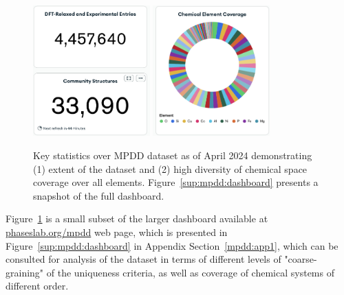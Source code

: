 \begin{figure}[H]
    \centering
    \includegraphics[width=0.4\textwidth]{mpdd/Screenshot 2024-05-05 at 11.54.32.png}
    \includegraphics[width=0.4\textwidth]{mpdd/Screenshot 2024-05-05 at 11.54.47.png}
    \caption{Key statistics over MPDD dataset as of April 2024 demonstrating (1) extent of the dataset and (2) high diversity of chemical space coverage over all elements. Figure~\ref{sup:mpdd:dashboard} presents a snapshot of the full dashboard.}
    \label{mpdd:fig:dataset}
\end{figure}

Figure~\ref{mpdd:fig:dataset} is a small subset of the larger dashboard available at \href{https://phaseslab.org/mpdd}{phaseslab.org/mpdd} web page, which is presented in Figure~\ref{sup:mpdd:dashboard} in Appendix Section~\ref{mpdd:app1}, which can be consulted for analysis of the dataset in terms of different levels of "coarse-graining" of the uniqueness criteria, as well as coverage of chemical systems of different order.

